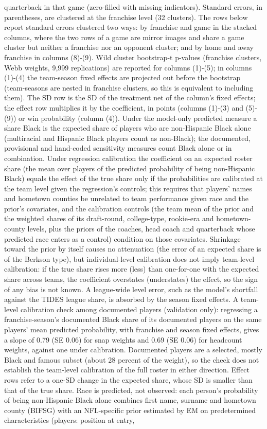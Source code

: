 {quarterback in that game (zero-filled with missing indicators). Standard errors, in parentheses, are clustered at the franchise level (32 clusters). The rows below report standard errors clustered two ways: by franchise and game in the stacked columns, where the two rows of a game are mirror images and share a game cluster but neither a franchise nor an opponent cluster; and by home and away franchise in columns (8)-(9). Wild cluster bootstrap-t p-values (franchise clusters, Webb weights, 9,999 replications) are  reported for columns (1)-(5); in columns (1)-(4) the team-season fixed effects are projected out before the bootstrap (team-seasons are nested in franchise clusters, so this is equivalent to including them). The SD row is the SD of the treatment net of the column's fixed effects; the effect row multiplies it by the coefficient, in points (columns (1)-(3) and (5)-(9)) or win probability (column (4)). Under the model-only predicted measure a share Black is the expected share of players who are non-Hispanic Black alone (multiracial and Hispanic Black players count as non-Black); the documented, provisional and hand-coded sensitivity measures count Black alone or in combination. Under regression calibration the coefficient on an expected roster share (the mean over players of the predicted probability of being non-Hispanic Black) equals the effect of the true share only if the probabilities are calibrated at the team level given the regression's controls; this requires that players' names and hometown counties be unrelated to team performance given race and the prior's covariates, and the calibration controls (the team mean of the prior and the weighted shares of its draft-round, college-type, rookie-era and hometown-county levels, plus the priors of the coaches, head coach and quarterback whose predicted race enters as a control) condition on those covariates. Shrinkage toward the prior by itself causes no attenuation (the error of an expected share is of the Berkson type), but individual-level calibration does not imply team-level calibration: if the true share rises more (less) than one-for-one with the expected share across teams, the coefficient overstates (understates) the effect, so the sign of any bias is not known. A league-wide level error, such as the model's shortfall against the TIDES league share, is absorbed by the season fixed effects. A team-level calibration check among documented players (validation only): regressing a franchise-season's documented Black share of its documented players on the same players' mean predicted probability, with franchise and season fixed effects, gives a slope of 0.79 (SE 0.06) for snap weights and  0.69 (SE 0.06) for headcount weights, against one under calibration. Documented players are a selected, mostly Black and famous subset (about 28 percent of the weight), so the check does not establish the team-level calibration of the full roster in either direction. Effect rows refer to a one-SD change in the expected share, whose SD is smaller than that of the true share. Race is predicted, not observed: each person's probability of being non-Hispanic Black alone combines first name, surname and hometown county (BIFSG) with an NFL-specific prior estimated by EM on predetermined characteristics (players: position at entry, }
